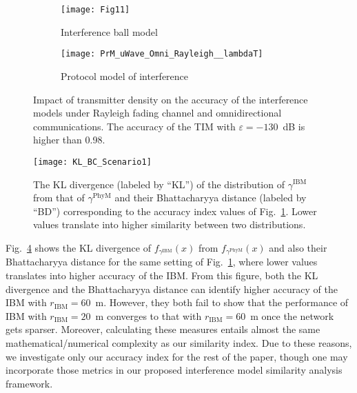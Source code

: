 \documentclass[12pt, draftclsnofoot, onecolumn]{IEEEtran}
\begin{document}
\begin{figure}[!t]
	\centering
    \begin{subfigure}[t]{0.49\columnwidth}
       \centering
		\texttt{[image: Fig11]}
	   \caption{Interference ball model}\label{subfig: IBM_uWave_Omni_Rayleigh__lambdaT}
    \end{subfigure}
    \begin{subfigure}[t]{0.49\columnwidth}
       \centering
       \texttt{[image: PrM\_uWave\_Omni\_Rayleigh\_\_lambdaT]}
	   \caption{Protocol model of interference}
       \label{subfig: PRM_uWave_Omni_Rayleigh__lambdaT}
    \end{subfigure}	
	
    \caption{Impact of transmitter density on the accuracy of the interference models under Rayleigh fading channel and omnidirectional communications. The accuracy of the TIM with $\varepsilon = -130$~dB is higher than 0.98.}
	\label{fig: uWave_Omni_Rayleigh__lambdaT}
\end{figure}

\begin{figure}[!t]
	\centering
	\texttt{[image: KL\_BC\_Scenario1]}

    \caption{The KL divergence (labeled by ``KL'') of the distribution of $\gamma^{\mathrm{IBM}}$ from that of $\gamma^{\mathrm{PhyM}}$ and their Bhattacharyya distance (labeled by ``BD'') corresponding to the accuracy index values of Fig.~\ref{subfig: IBM_uWave_Omni_Rayleigh__lambdaT}. Lower values translate into higher similarity between two distributions.}
	\label{fig: KL_BC_Scenario1}
\end{figure}
Fig.~\ref{fig: KL_BC_Scenario1} shows the KL divergence of $f_{\gamma^{\mathrm{IBM}}}(x)$ from $f_{\gamma^{\mathrm{PhyM}}}(x)$ and also their Bhattacharyya distance for the same setting of Fig.~\ref{subfig: IBM_uWave_Omni_Rayleigh__lambdaT}, where lower values translates into higher accuracy of the IBM. From this figure, both the KL divergence and the Bhattacharyya distance can identify higher accuracy of the IBM with $r_{\text{IBM}}=60$~m. However, they both fail to show that the performance of IBM with $r_{\text{IBM}}=20$~m converges to that with $r_{\text{IBM}}=60$~m once the network gets sparser. Moreover, calculating these measures entails almost the same mathematical/numerical complexity as our similarity index. Due to these reasons, we investigate only our accuracy index for the rest of the paper, though one may incorporate those metrics in our proposed interference model similarity analysis framework.
\end{document}
